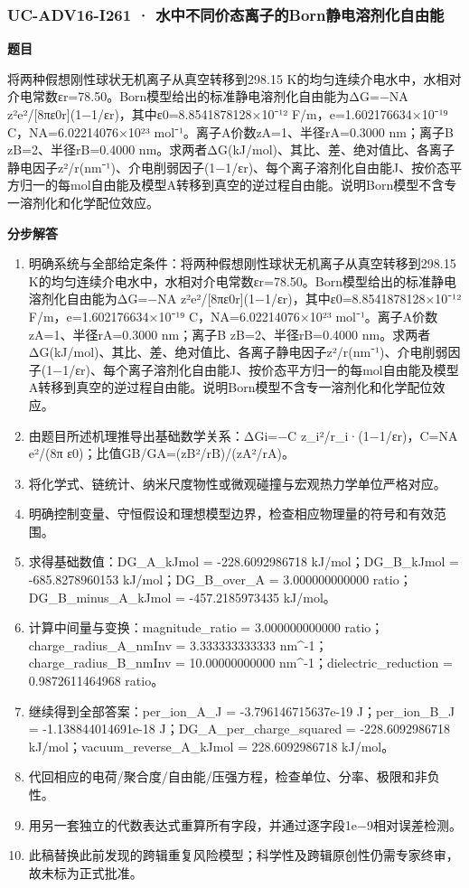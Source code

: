 \documentclass[UTF8,11pt,a4paper]{ctexart}
\begin{document}
\subsubsection*{UC-ADV16-I261 · 水中不同价态离子的Born静电溶剂化自由能}
\noindent\textbf{题目}\par
将两种假想刚性球状无机离子从真空转移到298.15 K的均匀连续介电水中，水相对介电常数εr=78.50。Born模型给出的标准静电溶剂化自由能为ΔG=−NA z²e²/[8πε0r](1−1/εr)，其中ε0=8.8541878128×10⁻¹² F/m，e=1.602176634×10⁻¹⁹ C，NA=6.02214076×10²³ mol⁻¹。离子A价数zA=1、半径rA=0.3000 nm；离子B zB=2、半径rB=0.4000 nm。求两者ΔG(kJ/mol)、其比、差、绝对值比、各离子静电因子z²/r(nm⁻¹)、介电削弱因子(1−1/εr)、每个离子溶剂化自由能J、按价态平方归一的每mol自由能及模型A转移到真空的逆过程自由能。说明Born模型不含专一溶剂化和化学配位效应。\par
\medskip\noindent\textbf{分步解答}
\begin{enumerate}
\item 明确系统与全部给定条件：将两种假想刚性球状无机离子从真空转移到298.15 K的均匀连续介电水中，水相对介电常数εr=78.50。Born模型给出的标准静电溶剂化自由能为ΔG=−NA z²e²/[8πε0r](1−1/εr)，其中ε0=8.8541878128×10⁻¹² F/m，e=1.602176634×10⁻¹⁹ C，NA=6.02214076×10²³ mol⁻¹。离子A价数zA=1、半径rA=0.3000 nm；离子B zB=2、半径rB=0.4000 nm。求两者ΔG(kJ/mol)、其比、差、绝对值比、各离子静电因子z²/r(nm⁻¹)、介电削弱因子(1−1/εr)、每个离子溶剂化自由能J、按价态平方归一的每mol自由能及模型A转移到真空的逆过程自由能。说明Born模型不含专一溶剂化和化学配位效应。
\item 由题目所述机理推导出基础数学关系：ΔGi=−C z\_i²/r\_i·(1−1/εr)，C=NA e²/(8π ε0)；比值GB/GA=(zB²/rB)/(zA²/rA)。
\item 将化学式、链统计、纳米尺度物性或微观碰撞与宏观热力学单位严格对应。
\item 明确控制变量、守恒假设和理想模型边界，检查相应物理量的符号和有效范围。
\item 求得基础数值：DG\_A\_kJmol = -228.6092986718 kJ/mol；DG\_B\_kJmol = -685.8278960153 kJ/mol；DG\_B\_over\_A = 3.000000000000 ratio；DG\_B\_minus\_A\_kJmol = -457.2185973435 kJ/mol。
\item 计算中间量与变换：magnitude\_ratio = 3.000000000000 ratio；charge\_radius\_A\_nmInv = 3.333333333333 nm\textasciicircum{}-1；charge\_radius\_B\_nmInv = 10.00000000000 nm\textasciicircum{}-1；dielectric\_reduction = 0.9872611464968 ratio。
\item 继续得到全部答案：per\_ion\_A\_J = -3.796146715637e-19 J；per\_ion\_B\_J = -1.138844014691e-18 J；DG\_A\_per\_charge\_squared = -228.6092986718 kJ/mol；vacuum\_reverse\_A\_kJmol = 228.6092986718 kJ/mol。
\item 代回相应的电荷/聚合度/自由能/压强方程，检查单位、分率、极限和非负性。
\item 用另一套独立的代数表达式重算所有字段，并通过逐字段1e−9相对误差检测。
\item 此稿替换此前发现的跨辑重复风险模型；科学性及跨辑原创性仍需专家终审，故未标为正式批准。
\end{enumerate}
\end{document}
